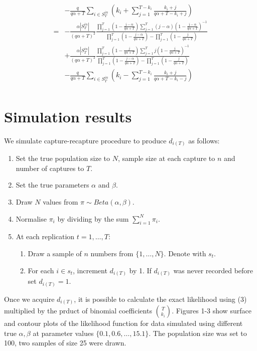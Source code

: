 \documentclass[a4paper, 12pt]{article}
\begin{document}
\begin{itemize}
\begin{align}
        &-\frac{q}{q\alpha + T} \sum_{i \in S_T^{in}} \left(k_i + \sum_{j = 1}^{T - k_i} \frac{k_i + j}{q\alpha + T - k_i + j}\right) \nonumber \\
        =& -\frac{\alpha|S_T^{in}|}{(q\alpha + T)^2} \frac{\prod_{j = 1}^{T} (1 - \frac{j - \alpha}{q\alpha + T}) \sum_{j = 1}^{T} (j - \alpha) (1 - \frac{j - \alpha}{q\alpha + T})^{-1} }{ \prod_{j=1}^T (1 - \frac{j - \alpha}{q\alpha + T}) - \prod_{j=1}^T (1 - \frac{j}{q\alpha + T})} \nonumber \\
        & +\frac{\alpha|S_T^{in}|}{(q\alpha + T)^2} \frac{ \prod_{j = 1}^{T} (1 - \frac{j}{q\alpha + T})\sum_{j = 1}^{T} j(1 - \frac{j}{q\alpha + T})^{-1} }{ \prod_{j=1}^T (1 - \frac{j - \alpha}{q\alpha + T}) - \prod_{j=1}^T (1 - \frac{j}{q\alpha + T})} \nonumber \\
        &- \frac{q}{q\alpha + T} \sum_{i \in S_T^{in}} \left( k_i - \sum_{j = 1}^{T - k_i} \frac{k_i + j}{q\alpha + T - k_i - j} \right) \nonumber \\
    \end{align}
\end{itemize}

\section{Simulation results}
We simulate capture-recapture procedure to produce $d_{i(T)}$ as follows:
\begin{enumerate}
    \item Set the true population size to $N$, sample size at each capture to $n$ and number of captures to $T$.
    \item Set the true parameters $\alpha$ and $\beta$.
    \item Draw $N$ values from $\pi \sim Beta(\alpha, \beta)$.
    \item Normalise $\pi_i$ by dividing by the sum $\sum_{i=1}^{N} \pi_i$.
    \item At each replication $t = 1,\dots,T$:
        \begin{enumerate}
            \item Draw a sample of $n$ numbers from $\{1,\dots,N\}$. Denote with $s_t$.
            \item For each $i \in s_t$, increment $d_{i(T)}$ by 1. If $d_{i(T)}$ was never recorded before set $d_{i(T)} = 1$.
        \end{enumerate}
\end{enumerate}
Once we acquire $d_{i(T)}$, it is possible to calculate the exact likelihood using (3) multiplied by the prduct of binomial coefficients $\binom{T}{k_i}$. Figures 1-3 show surface and contour plots of the likelihood function for data simulated using different true $\alpha, \beta$ at parameter values $\{0.1, 0.6, \dots, 15.1\}$. The population size was set to 100, two samples of size 25 were drawn.
\end{document}

